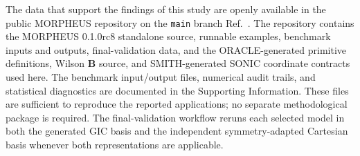 \documentclass[aip,jcp,reprint,longbibliography,floatfix]{revtex4-2}
\begin{document}
The data that support the findings of this study are openly available in
the public MORPHEUS repository on the \texttt{main} branch
Ref.~. The repository contains the
MORPHEUS 0.1.0rc8 standalone source, runnable examples, benchmark
inputs and outputs, final-validation data, and the ORACLE-generated primitive
definitions, Wilson $\mathbf{B}$ source, and SMITH-generated SONIC coordinate
contracts used here. The benchmark input/output files, numerical audit trails,
and statistical diagnostics are documented in the Supporting Information.
These files are sufficient to reproduce the reported applications; no separate
methodological package is required. The
final-validation workflow reruns each selected model in
both the generated GIC basis and the independent symmetry-adapted Cartesian
basis whenever both representations are applicable.




\end{document}
